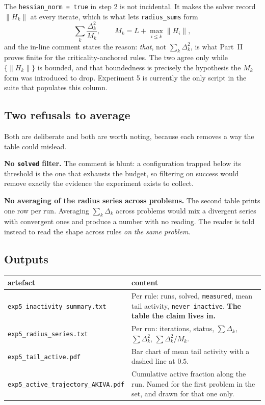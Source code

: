 \documentclass[11pt,a4paper]{article}
\newcommand{\jl}[1]{\texttt{\small #1}}
\newcommand{\file}[1]{\texttt{\small #1}}
\begin{document}
The \jl{hessian\_norm = true} in step 2 is not incidental. It makes the solver
record $\lVert H_k\rVert$ at every iterate, which is what lets \jl{radius\_sums}
form
\[
  \sum_k \frac{\Delta_k^2}{M_k},
  \qquad M_k = L + \max_{i \le k}\lVert H_i\rVert ,
\]
and the in-line comment states the reason: \emph{that}, not $\sum_k\Delta_k^2$, is
what Part~II proves finite for the criticality-anchored rules. The two agree only
while $\{\lVert H_k\rVert\}$ is bounded, and that boundedness is precisely the
hypothesis the $M_k$ form was introduced to drop. Experiment 5 is currently the
only script in the suite that populates this column.

\subsection{Two refusals to average}

Both are deliberate and both are worth noting, because each removes a way the table
could mislead.

\textbf{No \jl{solved} filter.} The comment is blunt: a configuration trapped below
its threshold is the one that exhausts the budget, so filtering on success would
remove exactly the evidence the experiment exists to collect.

\textbf{No averaging of the radius series across problems.} The second table prints
one row per run. Averaging $\sum_k\Delta_k$ across problems would mix a divergent
series with convergent ones and produce a number with no reading. The reader is
told instead to read the shape across rules \emph{on the same problem}.

\subsection{Outputs}

\begin{longtable}{@{}p{52mm}p{94mm}@{}}
\toprule
\textbf{artefact} & \textbf{content} \\
\midrule
\endhead
\file{exp5\_inactivity\_summary.txt} &
Per rule: runs, solved, \jl{measured}, mean tail activity, \jl{never inactive}.
\textbf{The table the claim lives in.} \\[3pt]
\file{exp5\_radius\_series.txt} &
Per run: iterations, status, $\sum\Delta_k$, $\sum\Delta_k^2$,
$\sum\Delta_k^2/M_k$. \\[3pt]
\file{exp5\_tail\_active.pdf} &
Bar chart of mean tail activity with a dashed line at $0.5$. \\[3pt]
\file{exp5\_active\_}\linebreak[0]\file{trajectory\_AKIVA.pdf} &
Cumulative active fraction along the run. Named for the first problem in the set,
and drawn for that one only. \\
\bottomrule
\end{longtable}
\end{document}
